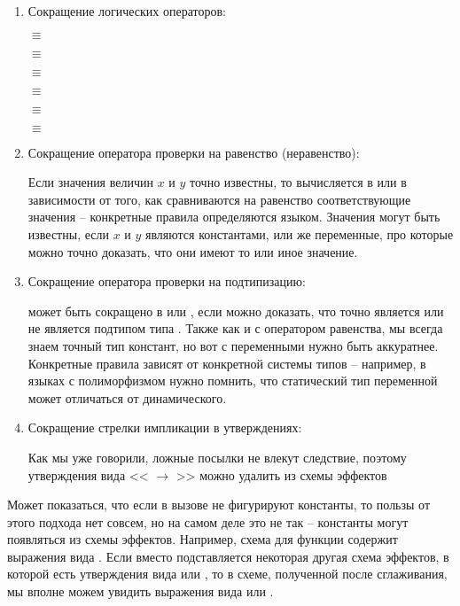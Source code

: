 \begin{enumerate}
	\item Сокращение логических операторов:
	
	 $\equiv$ 
	
	 $\equiv$ 
	
	 $\equiv$ 
	
	 $\equiv$ 
	
	 $\equiv$ 
	
	 $\equiv$ 
	
	\item Сокращение оператора проверки на равенство (неравенство):
	
	Если значения величин $x$ и $y$ точно известны, то  вычисляется в  или  в зависимости от того, как сравниваются на равенство соответствующие значения -- конкретные правила определяются языком. Значения могут быть известны, если $x$ и $y$ являются константами, или же переменные, про которые можно точно доказать, что они имеют то или иное значение. 
	
	\item Сокращение оператора проверки на подтипизацию:
	
	 может быть сокращено в  или , если можно доказать, что  точно является или не является подтипом типа . Также как и с оператором равенства, мы всегда знаем точный тип констант, но вот с переменными нужно быть аккуратнее. Конкретные правила зависят от конкретной системы типов -- например, в языках с полиморфизмом нужно помнить, что статический тип переменной может отличаться от динамического. 
	
	\item Сокращение стрелки импликации в утверждениях:
	
	Как мы уже говорили, ложные посылки не влекут следствие, поэтому утверждения вида << $\rightarrow$ >> можно удалить из схемы эффектов
\end{enumerate}

Может показаться, что если в вызове не фигурируют константы, то пользы от этого подхода нет совсем, но на самом деле это не так -- константы могут появляться из схемы эффектов. Например, схема для функции  содержит выражения вида . Если вместо  подставляется некоторая другая схема эффектов, в которой есть утверждения вида  или , то в схеме, полученной после сглаживания, мы вполне можем увидить выражения вида  или .

